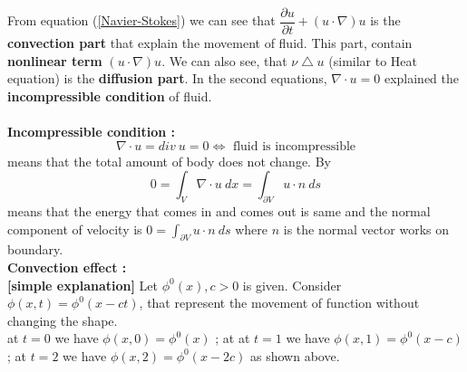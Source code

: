 \documentclass[a4paper,10pt]{article}
\begin{document}
From equation (\ref{Navier-Stokes}) we can see that $ \dfrac{\partial u}{\partial t} + (u \cdot \nabla) u $ is the \textbf{convection part} that explain the movement of fluid. This part, contain \textbf{nonlinear term} $ (u \cdot \nabla) u $. We can also see, that $ \nu \bigtriangleup u $ (similar to Heat equation) is the \textbf{diffusion part}. In the second equations, $ \nabla \cdot u = 0 $ explained the \textbf{incompressible condition} of fluid. \\ \\
\textbf{Incompressible condition :}
\[ \nabla \cdot u = div \ u = 0 \Leftrightarrow \text{ fluid is incompressible} \]
means that the total amount of body does not change. By
\[ 0 = \int_{V} \nabla \cdot u \ dx = \int_{\partial V} u \cdot n \ ds \]
means that the energy that comes in and comes out is same and the normal component of velocity is $ 0 = \int_{\partial V} u \cdot n \ ds $ where $ n $ is the normal vector works on boundary. \vspace{3cm} \\
\textbf{Convection effect :}\\
\textbf{[simple explanation]} Let $ \phi^{0}(x), c>0 $ is given. Consider $ \phi(x,t) = \phi^{0}(x-ct) $, that represent the movement of function without changing the shape. \vspace{4cm} \\
at $ t=0 $ we have $ \phi(x,0) = \phi^{0}(x) $ ; at at $ t=1 $ we have $ \phi(x,1) = \phi^{0}(x-c) $ ; at $ t=2 $ we have $ \phi(x,2) = \phi^{0}(x-2c) $ as shown above.
\end{document}
